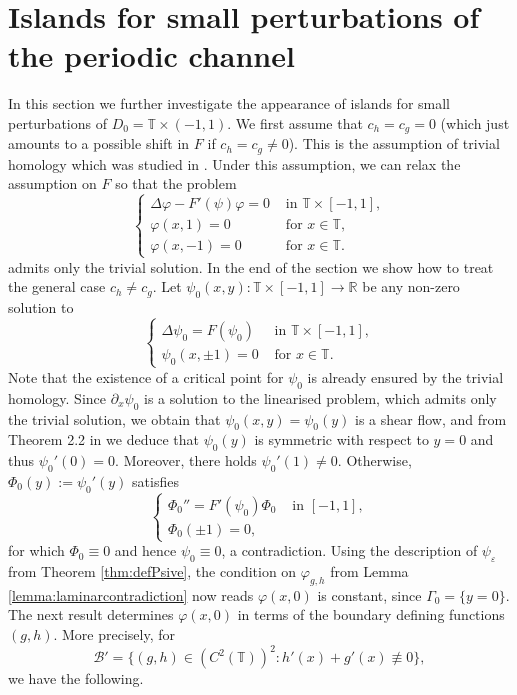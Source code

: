 \documentclass[11pt,reqno]{amsproc}
\newcommand{\R}{\mathbb{R}}
\newcommand{\ve}{\varepsilon}
\numberwithin{equation}{section}
\numberwithin{theorem}{section}
\numberwithin{prop}{section}
\numberwithin{cor}{section}
\numberwithin{lemma}{section}
\theoremstyle{remark}
\theoremstyle{definition}
\begin{document}
\section{Islands for small perturbations of the periodic channel}\label{sec:pert}
In this section we further investigate the appearance of islands for small perturbations of $D_0=\mathbb{T}\times(-1,1)$.  We first assume that $c_h=c_g=0$ (which just amounts to a possible shift in $F$ if $c_h=c_g\neq 0$).  This is the assumption of trivial homology which was studied in \cite{drivas2024islands}. Under this assumption, we can relax the assumption on $F$ so that the problem
\begin{equation}\label{eq:linearpdeF'}
\begin{cases}
\Delta\varphi - F'(\psi) \varphi = 0 & \text{ in } \mathbb{T}\times[-1,1], \\
\varphi(x,1)=0 & \text{ for } x\in\mathbb{T}, \\
\varphi(x,-1)=0 & \text{ for } x\in\mathbb{T}.
\end{cases}
\end{equation}
 admits only the trivial solution. In the end of the section we show how to treat the general case $c_h\neq c_g$. 
Let $\psi_0(x,y):\mathbb{T}\times[-1,1]\rightarrow\R$ be any non-zero solution to 
\begin{equation}\label{eq:Psi0}
\begin{cases}
\Delta\psi_0 = F(\psi_0) & \text{ in } \mathbb{T}\times[-1,1], \\
\psi_0(x,\pm 1)=0 & \text{ for } x\in\mathbb{T}.
\end{cases}
\end{equation}
Note that the existence of a critical point for $\psi_0$ is already ensured by the trivial homology.  %
Since $\partial_x\psi_0$ is a solution to the linearised problem, which admits only the trivial solution,  we obtain that $\psi_0(x,y) = \psi_0(y)$ is a shear flow, and from Theorem 2.2 in \cite{bcn97} we deduce that $\psi_0(y)$ is symmetric with respect to $y=0$ and thus $\psi_0'(0)=0$. Moreover, there holds $\psi_0'(1)\neq 0$. Otherwise,  $\Phi_0(y):=\psi_0'(y)$ satisfies
\begin{equation}\label{eq:Phi0}
\begin{cases}
\Phi_0'' = F'(\psi_0)\Phi_0 & \text{ in } [-1,1], \\
\Phi_0(\pm 1)=0, & 
\end{cases}
\end{equation}
for which $\Phi_0\equiv 0$ and hence $\psi_0\equiv 0$, a contradiction. Using the description of $\psi_\ve$ from Theorem \ref{thm:defPsive}, the condition on $\varphi_{g,h}$ from Lemma \ref{lemma:laminarcontradiction} now reads $\varphi(x,0)$ is constant, since $\Gamma_0 = \lbrace y = 0\rbrace$. The next result determines  $\varphi(x,0)$ in terms of the boundary defining functions $(g,h)$. More precisely, for
\begin{equation}\label{eq:defBprime}
\mathcal{B}'=\lbrace (g,h)\in (C^2(\mathbb{T}))^2 : h'(x)+g'(x)\not\equiv 0 \rbrace,
\end{equation}
we have the following.
\end{document}
